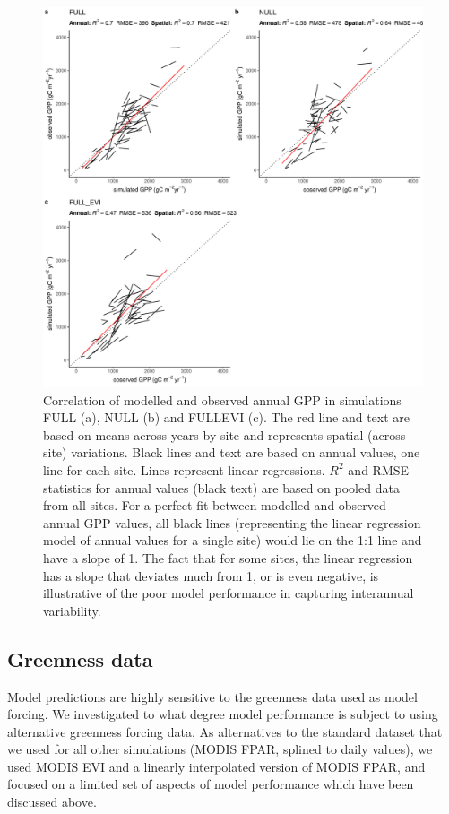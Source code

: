 \documentclass{myreport}
\begin{document}
\begin{figure}[!ht]
    \includegraphics[width=\textwidth]{fig/modobs_spatial_annual.pdf}
    \caption{Correlation of modelled and observed annual GPP in simulations FULL (a), NULL (b) and FULL\textunderscore EVI (c). The red line and text are based on means across years by site and represents spatial (across-site) variations. Black lines and text are based on annual values, one line for each site. Lines represent linear regressions. $R^2$ and RMSE statistics for annual values (black text) are based on pooled data from all sites. For a perfect fit between modelled and observed annual GPP values, all black lines (representing the linear regression model of annual values for a single site) would lie on the 1:1 line and have a slope of 1. The fact that for some sites, the linear regression has a slope that deviates much from 1, or is even negative, is illustrative of the poor model performance in capturing interannual variability.}
    \label{fig:modobs_spatialannual}
\end{figure}


\subsection{Greenness data}
\label{sec:results_greenness}

Model predictions are highly sensitive to the greenness data used as model forcing. We investigated to what degree model performance is subject to using alternative greenness forcing data. As alternatives to the standard dataset that we used for all other simulations (MODIS FPAR, splined to daily values), we used MODIS EVI and a linearly interpolated version of MODIS FPAR, and focused on a limited set of aspects of model performance which have been discussed above.
\end{document}
